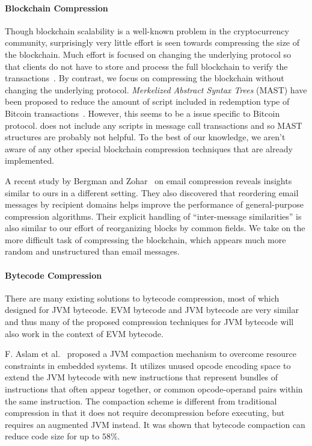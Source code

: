 \paragraph{Blockchain Compression}
Though blockchain scalability is a well-known problem in the cryptocurrency community,
surprisingly very little effort is seen towards compressing the size of the blockchain.
Much effort is focused on changing the underlying protocol so that clients
do not have to store and process the full blockchain to verify the transactions~\cite{lightclient, ultimate}.
By contrast, we focus on compressing the blockchain without changing the underlying protocol.
\emph{Merkelized Abstract Syntax Trees} (MAST) have been proposed to reduce the amount of script included in redemption
type of Bitcoin transactions~\cite{mast}. 
However, this seems to be a issue specific to Bitcoin protocol.  
\eth{} does not include any scripts in message call transactions and so  MAST structures are probably not helpful.
To the best of our knowledge, we aren't aware of any other special blockchain compression techniques that are already implemented. 

A recent study by Bergman and Zohar~\cite{bergman2015compressing} on email compression
reveals insights similar to ours in a different setting.
They also discovered that reordering email messages by recipient domains helps improve
the performance of general-purpose compression algorithms.
Their explicit handling of ``inter-message similarities'' is also similar to our effort of reorganizing blocks by common fields.
We take on the more difficult task of compressing the \eth{} blockchain,
which appears much more random and unstructured than email messages.

\paragraph{Bytecode Compression}
There are many existing solutions to bytecode compression, most of which designed for JVM bytecode.
EVM bytecode and JVM bytecode are very similar and thus many of the proposed compression techniques for JVM bytecode
will also work in the context of EVM bytecode.

F. Aslam et al.~\cite{aslam2010} proposed a JVM compaction mechanism to overcome resource constraints in embedded systems.
It utilizes unused opcode encoding space to extend the JVM bytecode with new instructions that represent bundles of
instructions that often appear together, or common opcode-operand pairs within the same instruction.
The compaction scheme is different from traditional compression in that it does not require decompression before executing,
but requires an augmented JVM instead. It was shown that bytecode compaction can reduce code size for up to $58\%$.

